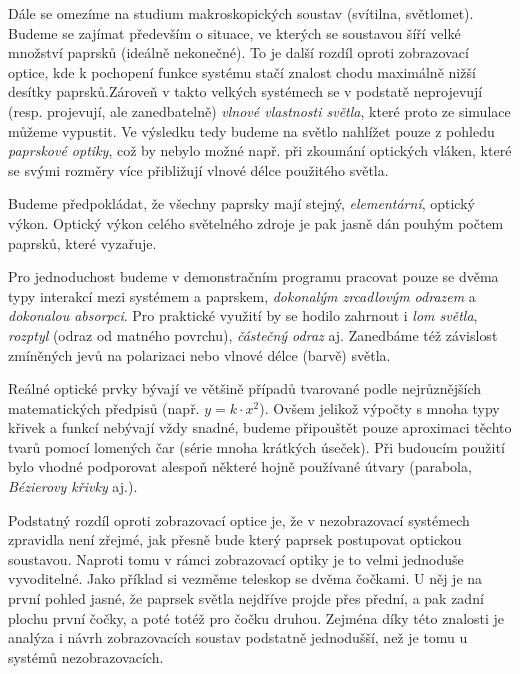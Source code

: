 Dále se omezíme na studium makroskopických soustav (svítilna, světlomet). Budeme se zajímat především o situace, ve kterých se soustavou šíří velké množství paprsků (ideálně nekonečné). To je další rozdíl oproti zobrazovací optice, kde k pochopení funkce systému stačí znalost chodu maximálně nižší desítky paprsků.\src Zároveň v takto velkých systémech se v podstatě neprojevují (resp. projevují, ale zanedbatelně) \emph{vlnové vlastnosti světla}, které proto ze simulace můžeme vypustit. Ve výsledku tedy budeme na světlo nahlížet pouze z pohledu \emph{paprskové optiky}, což by nebylo možné např. při zkoumání optických vláken, které se svými rozměry více přibližují vlnové délce použitého světla.

Budeme předpokládat, že všechny paprsky mají stejný, \emph{elementární}, optický výkon. Optický výkon celého světelného zdroje je pak jasně dán pouhým počtem paprsků, které vyzařuje.

Pro jednoduchost budeme v demonstračním programu pracovat pouze se dvěma typy interakcí mezi systémem a paprskem, \emph{dokonalým zrcadlovým odrazem} a \emph{dokonalou absorpci}. Pro praktické využití by se hodilo zahrnout i \emph{lom světla}, \emph{rozptyl} (odraz od matného povrchu), \emph{částečný odraz} aj. Zanedbáme též závislost zmíněných jevů na polarizaci nebo vlnové délce (barvě) světla.



Reálné optické prvky bývají ve většině případů tvarované podle nejrůznějších matematických předpisů (např. $y = k \cdot x^2$). Ovšem jelikož výpočty s mnoha typy křivek a funkcí nebývají vždy snadné, budeme připouštět pouze aproximaci těchto tvarů pomocí lomených čar (série mnoha krátkých úseček). Při budoucím použití bylo vhodné podporovat alespoň některé hojně používané útvary (parabola, \emph{Bézierovy křivky} aj.).


Podstatný rozdíl oproti zobrazovací optice je, že v nezobrazovací systémech zpravidla není zřejmé, jak přesně bude který paprsek postupovat optickou soustavou. Naproti tomu v rámci zobrazovací optiky je to velmi jednoduše vyvoditelné. Jako příklad si vezměme teleskop se dvěma čočkami. U něj je na první pohled jasné, že paprsek světla nejdříve projde přes přední, a pak zadní plochu první čočky, a poté totéž pro čočku druhou. Zejména díky této znalosti je analýza i návrh zobrazovacích soustav podstatně jednodušší, než je tomu u systémů nezobrazovacích.
